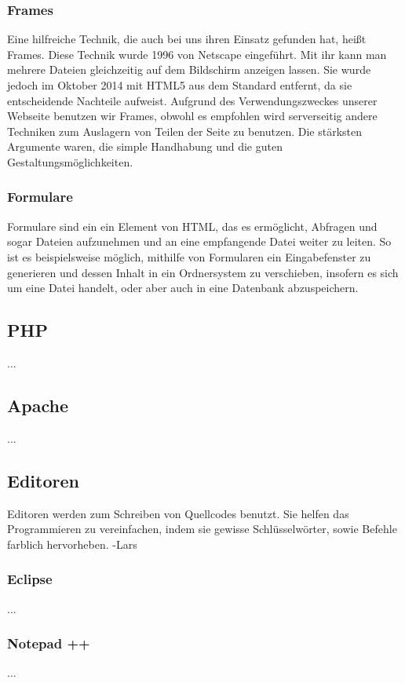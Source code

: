 \documentclass[12pt,a4paper,bibliography=totocnumbered,listof=totocnumbered]{scrartcl}
\begin{document}
\subsubsection{Frames}
Eine hilfreiche Technik, die auch bei uns ihren Einsatz gefunden hat, heißt Frames. Diese Technik wurde 1996 von Netscape eingeführt. Mit ihr kann man mehrere Dateien gleichzeitig auf dem Bildschirm anzeigen lassen.\cite{HTML/Frames} Sie wurde jedoch im Oktober 2014 mit HTML5 aus dem Standard entfernt, da sie entscheidende Nachteile aufweist. Aufgrund des Verwendungszweckes unserer Webseite benutzen wir Frames, obwohl es empfohlen wird serverseitig andere Techniken zum Auslagern von Teilen der Seite zu benutzen. Die stärksten Argumente waren, die simple Handhabung und die guten Gestaltungsmöglichkeiten.

\subsubsection{Formulare}
Formulare sind ein ein Element von HTML, das es ermöglicht, Abfragen und sogar Dateien aufzunehmen und an eine empfangende Datei weiter zu leiten. So ist es beispielsweise möglich, mithilfe von Formularen ein Eingabefenster zu generieren und dessen Inhalt in ein Ordnersystem zu verschieben, insofern es sich um eine Datei handelt, oder aber auch in eine Datenbank abzuspeichern.


\subsection{PHP}
...

\subsection{Apache}
...

\subsection{Editoren}
Editoren werden zum Schreiben von Quellcodes benutzt.
Sie helfen das Programmieren zu vereinfachen, indem sie gewisse Schlüsselwörter, sowie Befehle farblich hervorheben. -Lars
\subsubsection{Eclipse}
...

\subsubsection{Notepad ++}
...
\end{document}
